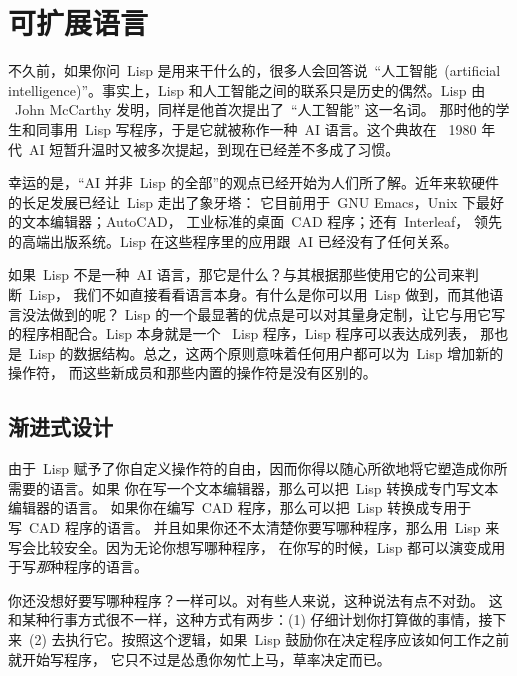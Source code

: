 
\chapter{可扩展语言}
\label{chap:the_extensible_language}

不久前，如果你问~Lisp 是用来干什么的，很多人会回答说~``人工智能~(artificial intelligence)''。事实上，Lisp 和人工智能之间的联系只是历史的偶然。Lisp 由
~John McCarthy 发明，同样是他首次提出了~``人工智能'' 这一名词。
那时他的学生和同事用~Lisp 写程序，于是它就被称作一种~\textsc{AI} 语言。这个典故在
~1980 年代~\textsc{AI} 短暂升温时又被多次提起，到现在已经差不多成了习惯。

幸运的是，``\textsc{AI} 并非~Lisp 的全部''的观点已经开始为人们所了解。近年来软硬件
的长足发展已经让~Lisp 走出了象牙塔：
它目前用于~GNU Emacs，Unix 下最好的文本编辑器；AutoCAD，
工业标准的桌面~\textsc{CAD} 程序；还有~Interleaf，
领先的高端出版系统。Lisp 在这些程序里的应用跟~\textsc{AI} 已经没有了任何关系。

如果~Lisp 不是一种~\textsc{AI} 语言，那它是什么？与其根据那些使用它的公司来判断~Lisp，
我们不如直接看看语言本身。有什么是你可以用~Lisp 做到，而其他语言没法做到的呢？
Lisp 的一个最显著的优点是可以对其量身定制，让它与用它写的程序相配合。Lisp 本身就是一个
~Lisp 程序，Lisp 程序可以表达成列表，
那也是~Lisp 的数据结构。总之，这两个原则意味着任何用户都可以为~Lisp 增加新的操作符，
而这些新成员和那些内置的操作符是没有区别的。

\section{渐进式设计}
\label{sec:design_by_evolution}

由于~Lisp 赋予了你自定义操作符的自由，因而你得以随心所欲地将它塑造成你所需要的语言。如果
你在写一个文本编辑器，那么可以把~Lisp 转换成专门写文本编辑器的语言。
如果你在编写~\textsc{CAD} 程序，那么可以把~Lisp 转换成专用于写~\textsc{CAD} 程序的语言。
并且如果你还不太清楚你要写哪种程序，那么用~Lisp 来写会比较安全。因为无论你想写哪种程序，
在你写的时候，Lisp 都可以演变成用于写\emph{那}种程序的语言。

你还没想好要写哪种程序？一样可以。对有些人来说，这种说法有点不对劲。
这和某种行事方式很不一样，这种方式有两步：(1) 仔细计划你打算做的事情，接下来~(2)
去执行它。按照这个逻辑，如果~Lisp 鼓励你在决定程序应该如何工作之前就开始写程序，
它只不过是怂恿你匆忙上马，草率决定而已。

